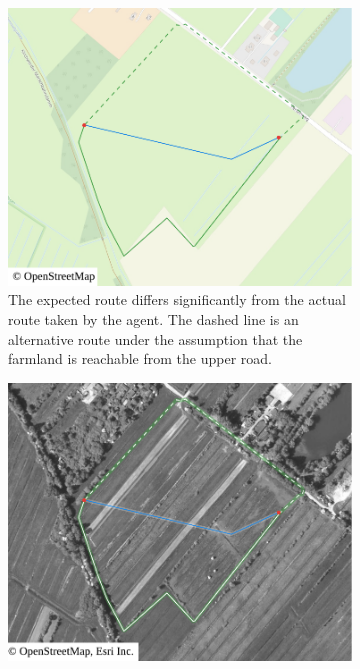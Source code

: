 			\begin{figure}[h!]
				\begin{minipage}[t]{.48\textwidth}
					\begin{subfigure}[t]{\linewidth}
						\includegraphics[width=\textwidth]{images/qgis-routing-rural-routing-6-osm}
						\caption{The expected route differs significantly from the actual route taken by the agent. The dashed line is an alternative route under the assumption that the farmland is reachable from the upper road.}
						\label{fig:eval-rural-routing-6-osm}
					\end{subfigure}
				\end{minipage}
				\hfill
				\begin{minipage}[t]{.48\textwidth}
					\begin{subfigure}[t]{\linewidth}
						\includegraphics[width=\textwidth]{images/qgis-routing-rural-routing-6-aerial}

\end{subfigure}
\end{minipage}
\end{figure}
